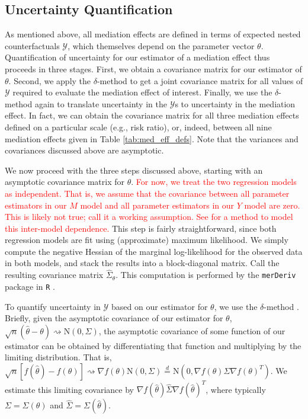 \documentclass{article}
\newcommand{\sY}{\mathcal{Y}}
\begin{document}
\subsection{Uncertainty Quantification}

As mentioned above, all mediation effects are defined in terms of expected nested counterfactuals $\sY$, which themselves depend on the parameter vector $\theta$. Quantification of uncertainty for our estimator of a mediation effect thus proceeds in three stages. First, we obtain a covariance matrix for our estimator of $\theta$. Second, we apply the $\delta$-method to get a joint covariance matrix for all values of $\sY$ required to evaluate the mediation effect of interest. Finally, we use the $\delta$-method again to translate uncertainty in the $\sY$s to uncertainty in the mediation effect. In fact, we can obtain the covariance matrix for all three mediation effects defined on a particular scale (e.g., risk ratio), or, indeed, between all nine mediation effects given in Table \ref{tab:med_eff_defs}. Note that the variances and covariances discussed above are asymptotic. 

We now proceed with the three steps discussed above, starting with an asymptotic covariance matrix for $\theta$. \textcolor{red}{For now, we treat the two regression models as independent. That is, we assume that the covariance between all parameter estimators in our $M$ model and all parameter estimators in our $Y$ model are zero. This is likely not true; call it a working assumption. See \citet{Bau06} for a method to model this inter-model dependence.} This step is fairly straightforward, since both regression models are fit using (approximate) maximum likelihood. We simply compute the negative Hessian of the marginal log-likelihood for the observed data in both models, and stack the results into a block-diagonal matrix. Call the resulting covariance matrix $\hat{\Sigma}_\theta$. This computation is performed by the \texttt{merDeriv} package in \texttt{R} \citep{Wan18}.

To quantify uncertainty in $\sY$ based on our estimator for $\theta$, we use the $\delta$-method \citep[see, e.g., Chapter 3 of][]{vdV98}. Briefly, given the asymptotic covariance of our estimator for $\theta$, $\sqrt{n}(\hat{\theta} - \theta) \rightsquigarrow \mathrm{N}(0, \Sigma)$, the asymptotic covariance of some function of our estimator can be obtained by differentiating that function and multiplying by the limiting distribution. That is, $\sqrt{n}[f(\hat{\theta}) - f(\theta)] \rightsquigarrow \nabla f(\theta)\mathrm{N}(0, \Sigma) \overset{d}{=} \mathrm{N}(0, \nabla f(\theta) \Sigma \nabla f(\theta)^T)$. We estimate this limiting covariance by $\nabla f(\hat{\theta}) \hat{\Sigma} \nabla f(\hat{\theta})^T$, where typically $\Sigma = \Sigma(\theta)$ and $\hat{\Sigma} = \Sigma(\hat{\theta})$.
\end{document}
